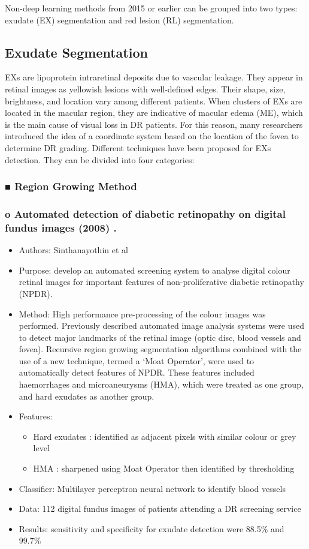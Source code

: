 \documentclass[12pt]{report}
\begin{document}
\noindent Non-deep learning methods from 2015 or earlier can be grouped into two types: exudate (EX) segmentation and red lesion (RL) segmentation.

\subsection{Exudate Segmentation}
EXs are lipoprotein intraretinal deposits due to vascular leakage. They appear in retinal images as yellowish lesions with well-defined edges. Their shape, size, brightness, and location vary among different patients. When clusters of EXs are located in the macular region, they are indicative of macular edema (ME), which is the main cause of visual loss in DR patients. For this reason, many researchers introduced the idea of a coordinate system based on the location of the fovea to determine DR grading. Different techniques have been proposed for EXs detection. They can be divided into four categories:

\subsubsection{■ Region Growing Method}
\subsubsection{o	Automated detection of diabetic retinopathy on digital fundus images (2008) \cite{sinthanayothin2002automated}.
}
\begin{itemize}
\item Authors: Sinthanayothin et al
\item Purpose: develop an automated screening system to analyse digital colour retinal images for important features of non-proliferative diabetic retinopathy (NPDR).
\item Method: High performance pre-processing of the colour images was performed. Previously described automated image analysis systems were used to detect major landmarks of the retinal image (optic disc, blood vessels and fovea). Recursive region growing segmentation algorithms combined with the use of a new technique, termed a ‘Moat Operator’, were used to automatically detect features of NPDR. These features included haemorrhages and microaneurysms (HMA), which were treated as one group, and hard exudates as another group.
\item Features:
\begin{itemize}
\item Hard exudates : identified as adjacent pixels with similar colour or grey level
\item HMA : sharpened using Moat Operator then identified by thresholding
\end{itemize}
\item Classifier: Multilayer perceptron neural network to identify blood vessels
\item Data: 112 digital fundus images of patients attending a DR screening service
\item Results: sensitivity and specificity for exudate detection were 88.5\% and 99.7\%
\end{itemize}
\end{document}
